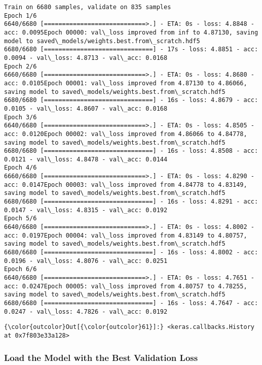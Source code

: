 \documentclass[11pt]{article}
\begin{document}
    \begin{Verbatim}[commandchars=\\\{\}]
Train on 6680 samples, validate on 835 samples
Epoch 1/6
6640/6680 [============================>.] - ETA: 0s - loss: 4.8848 - acc: 0.0095Epoch 00000: val\_loss improved from inf to 4.87130, saving model to saved\_models/weights.best.from\_scratch.hdf5
6680/6680 [==============================] - 17s - loss: 4.8851 - acc: 0.0094 - val\_loss: 4.8713 - val\_acc: 0.0168
Epoch 2/6
6660/6680 [============================>.] - ETA: 0s - loss: 4.8680 - acc: 0.0105Epoch 00001: val\_loss improved from 4.87130 to 4.86066, saving model to saved\_models/weights.best.from\_scratch.hdf5
6680/6680 [==============================] - 16s - loss: 4.8679 - acc: 0.0105 - val\_loss: 4.8607 - val\_acc: 0.0168
Epoch 3/6
6640/6680 [============================>.] - ETA: 0s - loss: 4.8505 - acc: 0.0120Epoch 00002: val\_loss improved from 4.86066 to 4.84778, saving model to saved\_models/weights.best.from\_scratch.hdf5
6680/6680 [==============================] - 16s - loss: 4.8508 - acc: 0.0121 - val\_loss: 4.8478 - val\_acc: 0.0144
Epoch 4/6
6660/6680 [============================>.] - ETA: 0s - loss: 4.8290 - acc: 0.0147Epoch 00003: val\_loss improved from 4.84778 to 4.83149, saving model to saved\_models/weights.best.from\_scratch.hdf5
6680/6680 [==============================] - 16s - loss: 4.8291 - acc: 0.0147 - val\_loss: 4.8315 - val\_acc: 0.0192
Epoch 5/6
6640/6680 [============================>.] - ETA: 0s - loss: 4.8002 - acc: 0.0197Epoch 00004: val\_loss improved from 4.83149 to 4.80757, saving model to saved\_models/weights.best.from\_scratch.hdf5
6680/6680 [==============================] - 16s - loss: 4.8002 - acc: 0.0196 - val\_loss: 4.8076 - val\_acc: 0.0251
Epoch 6/6
6640/6680 [============================>.] - ETA: 0s - loss: 4.7651 - acc: 0.0247Epoch 00005: val\_loss improved from 4.80757 to 4.78255, saving model to saved\_models/weights.best.from\_scratch.hdf5
6680/6680 [==============================] - 16s - loss: 4.7647 - acc: 0.0247 - val\_loss: 4.7826 - val\_acc: 0.0192

    \end{Verbatim}

\begin{Verbatim}[commandchars=\\\{\}]
{\color{outcolor}Out[{\color{outcolor}61}]:} <keras.callbacks.History at 0x7f803e33a128>
\end{Verbatim}
            
    \hypertarget{load-the-model-with-the-best-validation-loss}{%
\subsubsection{Load the Model with the Best Validation
Loss}\label{load-the-model-with-the-best-validation-loss}}
\end{document}
